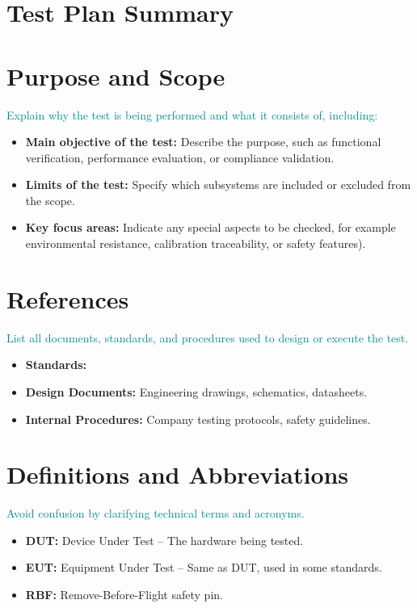 \documentclass{../common/latex/delta_base_styles/delta_base_styles}
\begin{document}
\makedeltaheader

\section{Test Plan Summary}
\makeversionapprovaltable

\section{Purpose and Scope}
\textcolor{DarkCyan} {Explain why the test is being performed and what it consists of, including:} 
\begin{itemize}
  \item \textbf{Main objective of the test:} Describe the purpose, such as functional verification, performance evaluation, or compliance validation.
  \item \textbf{Limits of the test:} Specify which subsystems are included or excluded from the scope.
  \item \textbf{Key focus areas:} Indicate any special aspects to be checked, for example environmental resistance, calibration traceability, or safety features).
\end{itemize}

\section{References}

\textcolor{DarkCyan} {List all documents, standards, and procedures used to design or execute the test.}
\begin{itemize}
  \item \textbf{Standards:} 
  \nocite{ISO29119,IEC60068,ISO17025} %
  \printbibliography[heading=none]
  \item \textbf{Design Documents:} Engineering drawings, schematics, datasheets.
  \item \textbf{Internal Procedures:} Company testing protocols, safety guidelines.
\end{itemize}

\section{Definitions and Abbreviations}

\textcolor{DarkCyan} {Avoid confusion by clarifying technical terms and acronyms.}
\begin{itemize}
  \item \textbf{DUT:} Device Under Test – The hardware being tested.
  \item \textbf{EUT:} Equipment Under Test – Same as DUT, used in some standards.
  \item \textbf{RBF:} Remove-Before-Flight safety pin.
\end{itemize}
\end{document}
